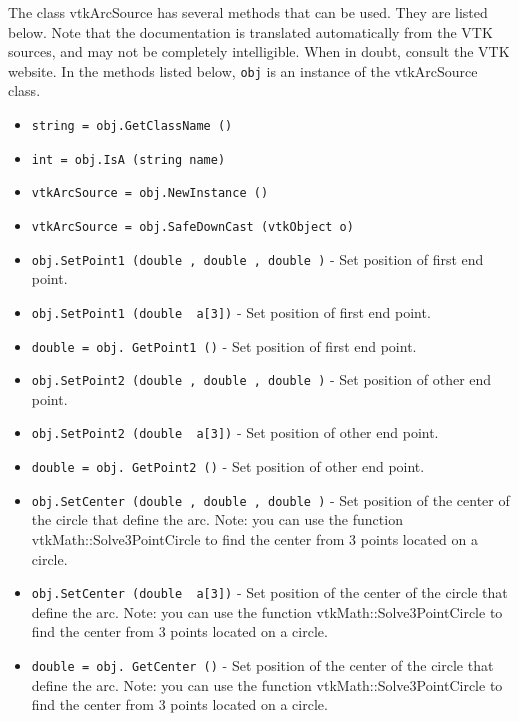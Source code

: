 The class vtkArcSource has several methods that can be used.
  They are listed below.
Note that the documentation is translated automatically from the VTK sources,
and may not be completely intelligible.  When in doubt, consult the VTK website.
In the methods listed below, \verb|obj| is an instance of the vtkArcSource class.
\begin{itemize}
\item  \verb|string = obj.GetClassName ()|

\item  \verb|int = obj.IsA (string name)|

\item  \verb|vtkArcSource = obj.NewInstance ()|

\item  \verb|vtkArcSource = obj.SafeDownCast (vtkObject o)|

\item  \verb|obj.SetPoint1 (double , double , double )| -  Set position of first end point.

\item  \verb|obj.SetPoint1 (double  a[3])| -  Set position of first end point.

\item  \verb|double = obj. GetPoint1 ()| -  Set position of first end point.

\item  \verb|obj.SetPoint2 (double , double , double )| -  Set position of other end point.

\item  \verb|obj.SetPoint2 (double  a[3])| -  Set position of other end point.

\item  \verb|double = obj. GetPoint2 ()| -  Set position of other end point.

\item  \verb|obj.SetCenter (double , double , double )| -  Set position of the center of the circle that define the arc.
 Note: you can use the function vtkMath::Solve3PointCircle to
 find the center from 3 points located on a circle.

\item  \verb|obj.SetCenter (double  a[3])| -  Set position of the center of the circle that define the arc.
 Note: you can use the function vtkMath::Solve3PointCircle to
 find the center from 3 points located on a circle.

\item  \verb|double = obj. GetCenter ()| -  Set position of the center of the circle that define the arc.
 Note: you can use the function vtkMath::Solve3PointCircle to
 find the center from 3 points located on a circle.


\end{itemize}
